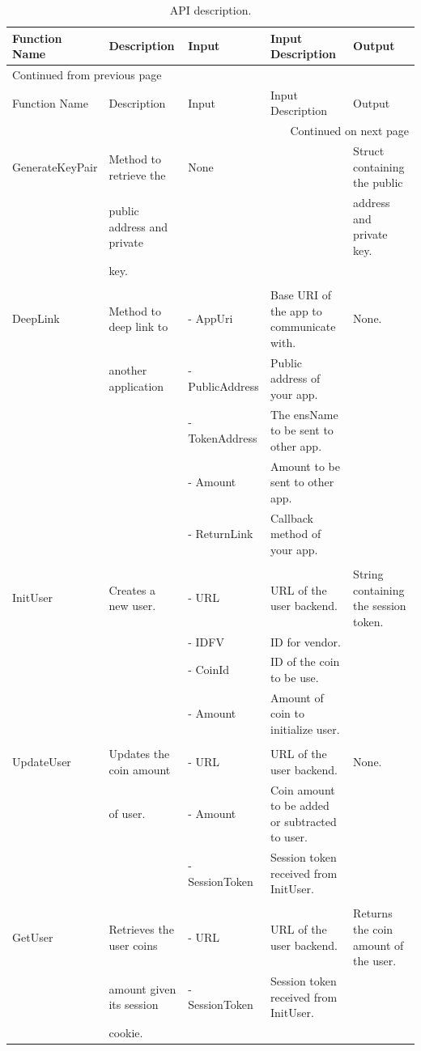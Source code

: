 \documentclass[a4paper, 11pt, titlepage]{article}
\begin{document}
\clearpage
{}
\begin{landscape}
\begin{longtable}{lllll}
\caption{\label{tab:org6eb3795}
API description.}
\\
Function Name & Description & Input & Input Description & Output\\
\hline
\endfirsthead
\multicolumn{5}{l}{Continued from previous page} \\
\hline

Function Name & Description & Input & Input Description & Output \\

\hline
\endhead
\hline\multicolumn{5}{r}{Continued on next page} \\
\endfoot
\endlastfoot
\hline
GenerateKeyPair & Method to retrieve the & None &  & Struct containing the public\\
 & public address and private &  &  & address and private key.\\
 & key. &  &  & \\
 &  &  &  & \\
DeepLink & Method to deep link to & - AppUri & Base URI of the app to communicate with. & None.\\
 & another application & - PublicAddress & Public address of your app. & \\
 &  & - TokenAddress & The ensName to be sent to other app. & \\
 &  & - Amount & Amount to be sent to other app. & \\
 &  & - ReturnLink & Callback method of your app. & \\
 &  &  &  & \\
InitUser & Creates a new user. & - URL & URL of the user backend. & String containing the session token.\\
 &  & - IDFV & ID for vendor. & \\
 &  & - CoinId & ID of the coin to be use. & \\
 &  & - Amount & Amount of coin to initialize user. & \\
 &  &  &  & \\
UpdateUser & Updates the coin amount & - URL & URL of the user backend. & None.\\
 & of user. & - Amount & Coin amount to be added or subtracted to user. & \\
 &  & - SessionToken & Session token received from InitUser. & \\
 &  &  &  & \\
GetUser & Retrieves the user coins & - URL & URL of the user backend. & Returns the coin amount of the user.\\
 & amount given its session & - SessionToken & Session token received from InitUser. & \\
 & cookie. &  &  & \\
\end{longtable}


\end{landscape}
\end{document}
